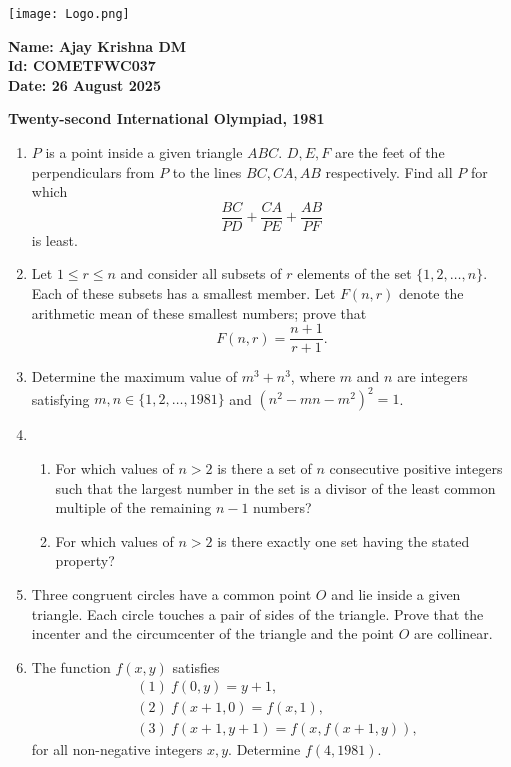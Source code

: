 \documentclass[12pt]{article}
\begin{document}
\begin{minipage}{0.45\textwidth}
  \texttt{[image: Logo.png]}
\end{minipage}
\hfill
\begin{minipage}{0.45\textwidth}
  \raggedleft
  \textbf{Name: Ajay Krishna DM}\\
  \textbf{Id: COMETFWC037}\\
  \textbf{Date: 26 August 2025}\\
\end{minipage}

\vspace{1cm}

\begin{center}
\textbf{Twenty-second International Olympiad, 1981}
\end{center}

\begin{enumerate}[label=1981/\arabic*., leftmargin=*]
  \item $P$ is a point inside a given triangle $ABC$. $D, E, F$ are the feet of the perpendiculars from $P$ to the lines $BC, CA, AB$ respectively. Find all $P$ for which
  \[
  \frac{BC}{PD} + \frac{CA}{PE} + \frac{AB}{PF}
  \]
  is least.

  \item Let $1 \leq r \leq n$ and consider all subsets of $r$ elements of the set $\{1,2,\ldots,n\}$. Each of these subsets has a smallest member. Let $F(n,r)$ denote the arithmetic mean of these smallest numbers; prove that
  \[
  F(n,r) = \frac{n+1}{r+1}.
  \]

  \item Determine the maximum value of $m^3+n^3$, where $m$ and $n$ are integers satisfying $m,n \in \{1,2,\ldots,1981\}$ and $(n^2-mn-m^2)^2 = 1$.

  \item 
  \begin{enumerate}[label=(\alph*), leftmargin=*]
    \item For which values of $n > 2$ is there a set of $n$ consecutive positive integers such that the largest number in the set is a divisor of the least common multiple of the remaining $n-1$ numbers?
    \item For which values of $n > 2$ is there exactly one set having the stated property?
  \end{enumerate}

  \item Three congruent circles have a common point $O$ and lie inside a given triangle. Each circle touches a pair of sides of the triangle. Prove that the incenter and the circumcenter of the triangle and the point $O$ are collinear.

  \item The function $f(x,y)$ satisfies
  \[
  \begin{aligned}
  & (1)\ f(0,y) = y+1, \\
  & (2)\ f(x+1,0) = f(x,1), \\
  & (3)\ f(x+1,y+1) = f(x, f(x+1,y)),
  \end{aligned}
  \]
  for all non-negative integers $x,y$. Determine $f(4,1981)$.
\end{enumerate}
\end{document}
